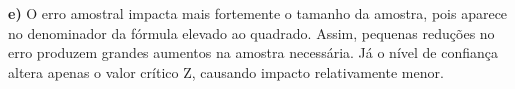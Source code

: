 \documentclass[fleqn, 12pt]{article}
\begin{document}
\begin{itemize}
\textbf{e)}
O erro amostral impacta mais fortemente o tamanho da amostra, pois aparece no denominador da fórmula elevado ao quadrado. Assim, pequenas reduções no erro produzem grandes aumentos na amostra necessária. Já o nível de confiança altera apenas o valor crítico Z, causando impacto relativamente menor.

\end{itemize}
\end{document}
